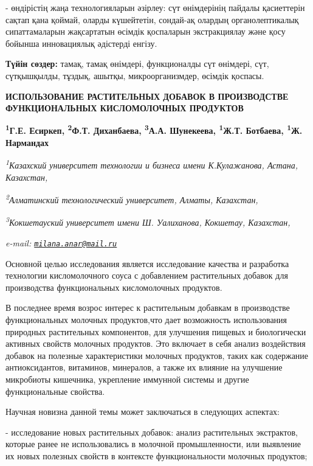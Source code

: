 - өндірістің жаңа технологияларын әзірлеу: сүт өнімдерінің пайдалы
қасиеттерін сақтап қана қоймай, оларды күшейтетін, сондай-ақ олардың
органолептикалық сипаттамаларын жақсартатын өсімдік қоспаларын
экстракциялау және қосу бойынша инновациялық әдістерді енгізу.

{\bfseries Түйін сөздер:} тамақ, тамақ өнімдері, функционалды сүт өнімдері,
сүт, сүтқышқылды, тұздық, ашытқы, микроорганизмдер, өсімдік қоспасы.

\begin{articleheader}
{\bfseries ИСПОЛЬЗОВАНИЕ РАСТИТЕЛЬНЫХ ДОБАВОК В ПРОИЗВОДСТВЕ ФУНКЦИОНАЛЬНЫХ КИСЛОМОЛОЧНЫХ ПРОДУКТОВ}

{\bfseries
\textsuperscript{1}Г.Е. Есиркеп\textsuperscript{\envelope },
\textsuperscript{2}Ф.Т. Диханбаева,
\textsuperscript{3}А.А. Шунекеева,
\textsuperscript{1}Ж.Т. Ботбаева,
\textsuperscript{1}Ж. Нармандах}
\end{articleheader}

\begin{affiliation}
\emph{\textsuperscript{1}Казахский университет технологии и бизнеса имени К.Кулажанова, Астана, Казахстан,}

\emph{\textsuperscript{2}Алматинский технологический университет, Алматы, Казахстан,}

\emph{\textsuperscript{3}Кокшетауский университет имени Ш. Уалиханова, Кокшетау, Казахстан,}

\emph{e-mail: \href{mailto:milana.anar@mail.ru}{\nolinkurl{milana.anar@mail.ru}}}
\end{affiliation}

Основной целью исследования является исследование качества и разработка
технологии кисломолочного соуса с добавлением растительных добавок для
производства функциональных кисломолочных продуктов.

В последнее время возрос интерес к растительным добавкам в производстве
функциональных молочных продуктов,что дает возможность использования
природных растительных компонентов, для улучшения пищевых и биологически
активных свойств молочных продуктов. Это включает в себя анализ
воздействия добавок на полезные характеристики молочных продуктов, таких
как содержание антиоксидантов, витаминов, минералов, а также их влияние
на улучшение микробиоты кишечника, укрепление иммунной системы и другие
функциональные свойства.

Научная новизна данной темы может заключаться в следующих
аспектах:

- исследование новых растительных добавок: анализ растительных
экстрактов, которые ранее не использовались в молочной промышленности,
или выявление их новых полезных свойств в контексте функциональности
молочных продуктов;

